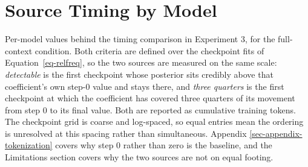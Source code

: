 \documentclass[11pt]{article}
\begin{document}
\endgroup{}

\newpage

\section{Source Timing by Model}\label{sec-appendix-timing}

Per-model values behind the timing comparison in Experiment 3, for the
full-context condition. Both criteria are defined over the checkpoint
fits of Equation~\ref{eq-relfreq}, so the two sources are measured on
the same scale: \emph{detectable} is the first checkpoint whose
posterior sits credibly above that coefficient's own step-0 value and
stays there, and \emph{three quarters} is the first checkpoint at which
the coefficient has covered three quarters of its movement from step 0
to its final value. Both are reported as cumulative training tokens. The
checkpoint grid is coarse and log-spaced, so equal entries mean the
ordering is unresolved at this spacing rather than simultaneous.
Appendix \ref{sec-appendix-tokenization} covers why step 0 rather than
zero is the baseline, and the Limitations section covers why the two
sources are not on equal footing.

\begingroup\fontsize{8}{10}\selectfont
\end{document}
